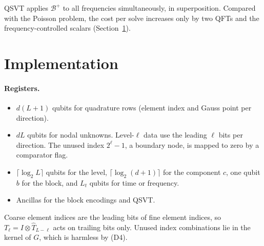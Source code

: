 \documentclass[11pt,a4paper]{article}
\newcommand{\B}{\mathcal{B}}
\theoremstyle{remark}
\begin{document}
QSVT applies $\B^+$ to all frequencies simultaneously, in superposition.
Compared with the Poisson problem, the cost per solve increases only by two
QFTs and the frequency-controlled scalars (Section~\ref{sec:impl}).

\section{Implementation}\label{sec:impl}

\paragraph{Registers.}
\begin{itemize}
\item $d(L+1)$ qubits for quadrature rows (element index and Gauss point
  per direction).
\item $dL$ qubits for nodal unknowns. Level-$\ell$ data use the leading $\ell$
  bits per direction. The unused index $2^\ell-1$, a boundary node, is mapped
  to zero by a comparator flag.
\item $\lceil\log_2L\rceil$ qubits for the level, $\lceil\log_2(d+1)\rceil$ for the
  component $c$, one qubit $b$ for the block, and $L_t$ qubits for time or
  frequency.
\item Ancillas for the block encodings and QSVT.
\end{itemize}
Coarse element indices are the leading bits of fine element indices, so
$T_\ell=I\otimes\widehat T_{L-\ell}$ acts on trailing bits only. Unused index
combinations lie in the kernel of $G$, which is harmless by (D4).
\end{document}
